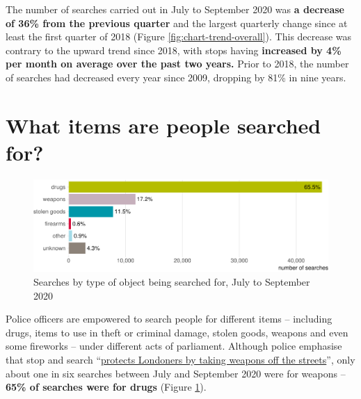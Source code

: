 \documentclass[
  a4paper,
  twoside, 11pt]{article}
\begin{document}
The number of searches carried out in July to September 2020 was \textbf{a decrease of 36\% from the previous quarter} and the largest quarterly change since at least the first quarter of 2018 (Figure \ref{fig:chart-trend-overall}).
This decrease was contrary to the upward trend since 2018, with stops having \textbf{increased by 4\% per month on average over the past two years.} Prior to 2018, the number of searches had decreased every year since 2009, dropping by 81\% in nine years.

\hypertarget{what-items-are-people-searched-for}{%
\section{What items are people searched for?}\label{what-items-are-people-searched-for}}



\begin{figure}[tb]

{\centering \includegraphics{2020-Q3_files/figure-latex/chart-search-types-1} 

}

\caption{Searches by type of object being searched for, July to September 2020}\label{fig:chart-search-types}
\end{figure}

Police officers are empowered to search people for different items -- including drugs, items to use in theft or criminal damage, stolen goods, weapons and even some fireworks -- under different acts of parliament. Although police emphasise that stop and search ``\href{https://www.met.police.uk/police-forces/metropolitan-police/areas/about-us/about-the-met/stop-and-search/}{protects Londoners by taking weapons off the streets}'', only about one in six searches between July and September 2020 were for weapons -- \textbf{65\% of searches were for drugs} (Figure \ref{fig:chart-search-types}).
\end{document}
